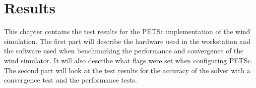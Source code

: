 \chapter{Results}

This chapter contains the test results for the PETSc implementation of the wind
simulation. The first part will describe the hardware used in the workstation
and the software used when benchmarking the performance and convergence of the
wind simulator. It will also describe what flags were set when configuring PETSc.
The second part will look at the test results for the accuracy of the solver
with a convergence test and the performance tests.




